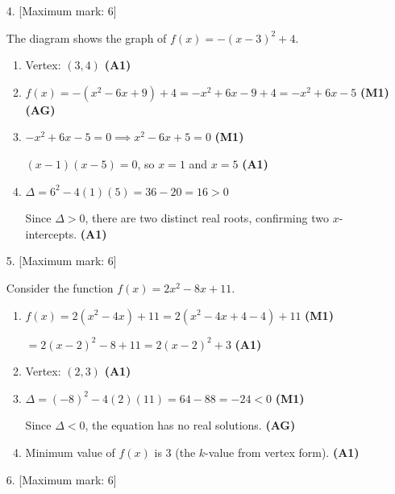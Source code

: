 \documentclass[12pt, twoside]{article}
\begin{document}
\begin{enumerate}[itemsep=0.15cm]
\item[4.] [Maximum mark: 6]

The diagram shows the graph of $f(x) = -(x - 3)^2 + 4$.

\begin{enumerate}[itemsep=0.3cm]
  \item Vertex: $(3, 4)$ \hfill \textbf{(A1)}

  \item $f(x) = -(x^2 - 6x + 9) + 4 = -x^2 + 6x - 9 + 4 = -x^2 + 6x - 5$ \hfill \textbf{(M1)(AG)}

  \item $-x^2 + 6x - 5 = 0 \implies x^2 - 6x + 5 = 0$ \hfill \textbf{(M1)}

  $(x - 1)(x - 5) = 0$, so $x = 1$ and $x = 5$ \hfill \textbf{(A1)}

  \item $\Delta = 6^2 - 4(1)(5) = 36 - 20 = 16 > 0$

  Since $\Delta > 0$, there are two distinct real roots,
  confirming two $x$-intercepts. \hfill \textbf{(A1)}
\end{enumerate}

\newpage

\item[5.] [Maximum mark: 6]

Consider the function $f(x) = 2x^2 - 8x + 11$.

\begin{enumerate}[itemsep=0.3cm]
  \item $f(x) = 2(x^2 - 4x) + 11 = 2(x^2 - 4x + 4 - 4) + 11$ \hfill \textbf{(M1)}

  $= 2(x - 2)^2 - 8 + 11 = 2(x - 2)^2 + 3$ \hfill \textbf{(A1)}

  \item Vertex: $(2, 3)$ \hfill \textbf{(A1)}

  \item $\Delta = (-8)^2 - 4(2)(11) = 64 - 88 = -24 < 0$ \hfill \textbf{(M1)}

  Since $\Delta < 0$, the equation has no real solutions. \hfill \textbf{(AG)}

  \item Minimum value of $f(x)$ is $3$ (the $k$-value from vertex form). \hfill \textbf{(A1)}
\end{enumerate}

\item[6.] [Maximum mark: 6]


\end{enumerate}
\end{document}
